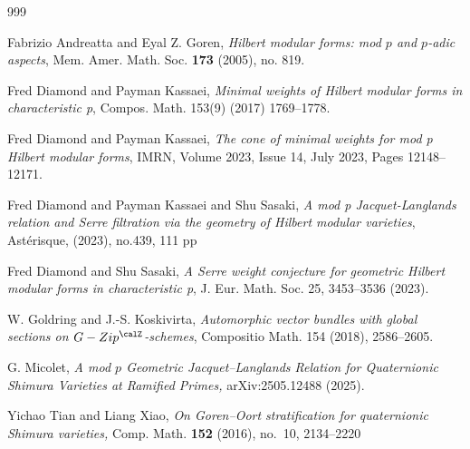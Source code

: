 \begin{thebibliography}{999}


 Fabrizio Andreatta and Eyal Z. Goren, \textit{Hilbert modular forms: mod $p$
and $p$-adic aspects}, Mem. Amer. Math. Soc. {\bf 173} (2005), no. 819.

 Fred Diamond and Payman Kassaei, \textit{Minimal weights of Hilbert modular forms in characteristic p}, Compos. Math. 153(9) (2017) 1769–1778.

 
 Fred Diamond and Payman Kassaei, \textit{The cone of minimal weights for mod p Hilbert modular forms}, IMRN, Volume 2023, Issue 14, July 2023, Pages 12148–12171.

 Fred Diamond and Payman Kassaei and Shu Sasaki, \textit{A mod p Jacquet-Langlands relation and Serre filtration via the geometry of Hilbert modular varieties}, Ast\'erisque, (2023), no.439, 111 pp

 Fred Diamond and  Shu Sasaki, \textit{A Serre weight conjecture for geometric Hilbert modular forms in characteristic p},  J. Eur. Math. Soc. 25, 3453–3536 (2023).

 

 

 W. Goldring and J.-S. Koskivirta, \textit{Automorphic vector bundles with global sections on $G-Zip^\calZ$-schemes}, Compositio Math. 154 (2018), 2586–2605.

 
 

 G. Micolet, \textit{A mod $p$ Geometric Jacquet--Langlands Relation
for Quaternionic Shimura Varieties at Ramified
Primes,} arXiv:2505.12488  (2025).


  Yichao Tian and Liang Xiao, \textit{On Goren--Oort stratification for quaternionic
Shimura varieties,} Comp. Math. {\bf 152} (2016), no.~10, 2134--2220

\end{thebibliography}
